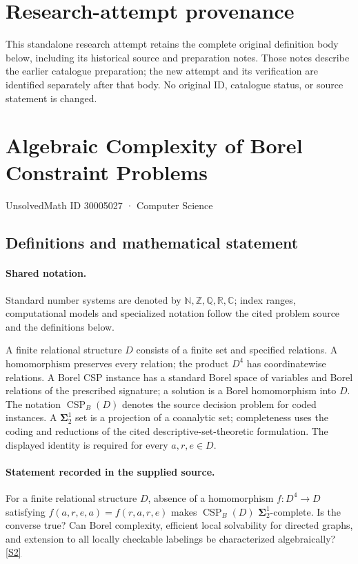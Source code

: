 \documentclass[11pt]{article}
\begin{document}
\section*{Research-attempt provenance}
This standalone research attempt retains the complete original definition body below,
including its historical source and preparation notes. Those notes describe the
earlier catalogue preparation; the new attempt and its verification are identified
separately after that body. No original ID, catalogue status, or source statement is changed.

\section{Algebraic Complexity of Borel Constraint Problems}\label{30005027}
{\small UnsolvedMath ID 30005027 · Computer Science}
\subsection{Definitions and mathematical statement}

\paragraph{Shared notation.}Standard number systems are denoted by $\mathbb N,\mathbb Z,\mathbb Q,\mathbb R,\mathbb C$; index ranges, computational models and specialized notation follow the cited problem source and the definitions below.


A finite relational structure $D$ consists of a finite set and specified relations. A homomorphism preserves every relation; the product $D^4$ has coordinatewise relations. A Borel CSP instance has a standard Borel space of variables and Borel relations of the prescribed signature; a solution is a Borel homomorphism into $D$. The notation $\operatorname{CSP}_B(D)$ denotes the source decision problem for coded instances. A $\boldsymbol{\Sigma}^1_2$ set is a projection of a coanalytic set; completeness uses the coding and reductions of the cited descriptive-set-theoretic formulation. The displayed identity is required for every $a,r,e\in D$.
\paragraph{Statement recorded in the supplied source.}
For a finite relational structure $D$, absence of a homomorphism $f:D^4\to D$ satisfying $f(a,r,e,a)=f(r,a,r,e)$ makes $\operatorname{CSP}_B(D)$ $\boldsymbol{\Sigma}^1_2$-complete. Is the converse true? Can Borel complexity, efficient local solvability for directed graphs, and extension to all locally checkable labelings be characterized algebraically? \href{https://doi.org/10.4171/owr/2022/8}{[S2]}
\end{document}
